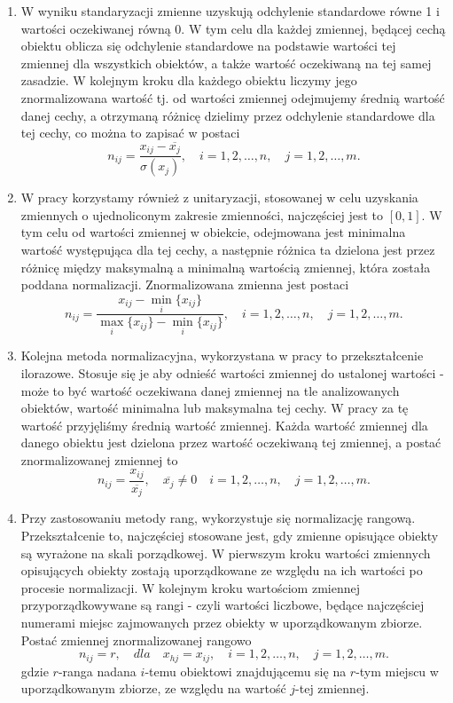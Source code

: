\documentclass[12pt,a4paper]{report}
\begin{document}
\begin{enumerate}
\item W wyniku standaryzacji zmienne uzyskują odchylenie standardowe równe 1 i wartości oczekiwanej  równą 0. W tym celu dla każdej zmiennej, będącej cechą obiektu oblicza się odchylenie standardowe na podstawie wartości tej zmiennej dla wszystkich obiektów, a także wartość oczekiwaną na tej samej zasadzie. W kolejnym kroku dla każdego obiektu liczymy jego znormalizowana wartość tj. od wartości zmiennej odejmujemy średnią wartość danej cechy, a otrzymaną różnicę dzielimy przez odchylenie standardowe dla tej cechy, co można to zapisać w postaci
$$
n_{ij}=\frac{x_{ij} - \overline{x_{j}}}{\sigma(x_j)}, \quad i = 1,2, \ldots, n, \quad j=1,2,\ldots, m.
$$



\item W pracy korzystamy również z unitaryzacji, stosowanej w celu uzyskania zmiennych o ujednoliconym zakresie zmienności, najczęściej jest to $[0,1]$. W tym celu od wartości zmiennej w obiekcie, odejmowana jest minimalna wartość występująca dla tej cechy, a następnie różnica ta dzielona jest przez różnicę między maksymalną a minimalną wartością zmiennej, która została poddana normalizacji. Znormalizowana zmienna jest postaci
$$
n_{ij}=\frac{x_{ij} - \min\limits_{i}\{x_{ij}\}}{\max\limits_{i} \{x_{ij}\} - \min\limits_{i} \{x_{ij}\}}, \quad i = 1,2, \ldots, n, \quad j=1,2,\ldots, m. 
$$
\item Kolejna metoda normalizacyjna, wykorzystana w pracy to przekształcenie ilorazowe. Stosuje się  je aby odnieść wartości zmiennej do ustalonej wartości - może to być wartość oczekiwana danej zmiennej na tle analizowanych obiektów, wartość minimalna lub maksymalna tej cechy. W pracy za tę wartość przyjęliśmy średnią wartość zmiennej. Każda wartość zmiennej dla danego obiektu jest dzielona przez wartość oczekiwaną tej zmiennej, a postać znormalizowanej zmiennej to
$$
n_{ij}=\frac{x_{ij}}{\overline{x_j}}, \quad \overline{x_j} \neq 0 \quad i = 1,2, \ldots, n, \quad j=1,2,\ldots, m.
$$ 
\item Przy zastosowaniu metody rang, wykorzystuje się normalizację rangową. Przekształcenie to, najczęściej stosowane jest, gdy zmienne opisujące obiekty są wyrażone na skali porządkowej. W pierwszym kroku wartości zmiennych opisujących obiekty zostają uporządkowane ze względu na ich wartości po procesie normalizacji. W kolejnym kroku wartościom zmiennej przyporządkowywane są rangi - czyli wartości liczbowe, będące najczęściej numerami miejsc zajmowanych przez obiekty w uporządkowanym zbiorze. Postać zmiennej znormalizowanej rangowo
$$
n_{ij}=r, \quad dla \quad x_{hj}=x_{ij}, \quad i = 1,2, \ldots, n, \quad j=1,2,\ldots, m.
$$
gdzie 
$r$-ranga nadana $i$-temu obiektowi znajdującemu się na $r$-tym miejscu w uporządkowanym zbiorze, ze względu na wartość $j$-tej zmiennej. 
\end{enumerate}
\end{document}
